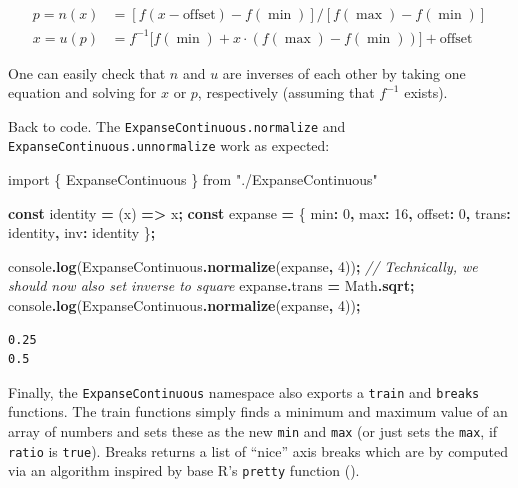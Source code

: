 \documentclass[
  openany]{book}
\newenvironment{Shaded}{\begin{snugshade}}{\end{snugshade}}
\newcommand{\AttributeTok}[1]{\textcolor[rgb]{0.13,0.29,0.53}{#1}}
\newcommand{\BuiltInTok}[1]{#1}
\newcommand{\CommentTok}[1]{\textcolor[rgb]{0.56,0.35,0.01}{\textit{#1}}}
\newcommand{\DecValTok}[1]{\textcolor[rgb]{0.00,0.00,0.81}{#1}}
\newcommand{\FunctionTok}[1]{\textcolor[rgb]{0.13,0.29,0.53}{\textbf{#1}}}
\newcommand{\ImportTok}[1]{#1}
\newcommand{\KeywordTok}[1]{\textcolor[rgb]{0.13,0.29,0.53}{\textbf{#1}}}
\newcommand{\NormalTok}[1]{#1}
\newcommand{\OperatorTok}[1]{\textcolor[rgb]{0.81,0.36,0.00}{\textbf{#1}}}
\newcommand{\StringTok}[1]{\textcolor[rgb]{0.31,0.60,0.02}{#1}}
\theoremstyle{definition}
\theoremstyle{definition}
\theoremstyle{definition}
\theoremstyle{definition}
\theoremstyle{remark}
\begin{document}
\begin{align}
p = n(x) &= [f(x - \text{offset}) - f(\min)] / [f(\max) - f(\min)] \\
x = u(p) &= f^{-1} \big[ f(\min) + x \cdot (f(\max) - f(\min)) \big] + \text{offset}
\end{align}

One can easily check that \(n\) and \(u\) are inverses of each other by taking one equation and solving for \(x\) or \(p\), respectively (assuming that \(f^{-1}\) exists).

Back to code. The \texttt{ExpanseContinuous.normalize} and \texttt{ExpanseContinuous.unnormalize} work as expected:

\begin{Shaded}
\begin{Highlighting}[]
\ImportTok{import}\NormalTok{ \{ ExpanseContinuous \} }\ImportTok{from} \StringTok{"./ExpanseContinuous"}

\KeywordTok{const}\NormalTok{ identity }\OperatorTok{=}\NormalTok{ (x) }\KeywordTok{=\textgreater{}}\NormalTok{ x}\OperatorTok{;}
\KeywordTok{const}\NormalTok{ expanse }\OperatorTok{=}\NormalTok{ \{ }
\NormalTok{  min}\OperatorTok{:} \DecValTok{0}\OperatorTok{,}\NormalTok{ max}\OperatorTok{:} \DecValTok{16}\OperatorTok{,}\NormalTok{ offset}\OperatorTok{:} \DecValTok{0}\OperatorTok{,} 
\NormalTok{  trans}\OperatorTok{:}\NormalTok{ identity}\OperatorTok{,}\NormalTok{ inv}\OperatorTok{:}\NormalTok{ identity }
\NormalTok{\}}\OperatorTok{;}

\BuiltInTok{console}\OperatorTok{.}\FunctionTok{log}\NormalTok{(ExpanseContinuous}\OperatorTok{.}\FunctionTok{normalize}\NormalTok{(expanse}\OperatorTok{,} \DecValTok{4}\NormalTok{))}\OperatorTok{;}
\CommentTok{// Technically, we should now also set inverse to square}
\NormalTok{expanse}\OperatorTok{.}\AttributeTok{trans} \OperatorTok{=} \BuiltInTok{Math}\OperatorTok{.}\FunctionTok{sqrt}\OperatorTok{;} 
\BuiltInTok{console}\OperatorTok{.}\FunctionTok{log}\NormalTok{(ExpanseContinuous}\OperatorTok{.}\FunctionTok{normalize}\NormalTok{(expanse}\OperatorTok{,} \DecValTok{4}\NormalTok{))}\OperatorTok{;}
\end{Highlighting}
\end{Shaded}

\begin{verbatim}
0.25
0.5
\end{verbatim}

Finally, the \texttt{ExpanseContinuous} namespace also exports a \texttt{train} and \texttt{breaks} functions. The train functions simply finds a minimum and maximum value of an array of numbers and sets these as the new \texttt{min} and \texttt{max} (or just sets the \texttt{max}, if \texttt{ratio} is \texttt{true}). Breaks returns a list of ``nice'' axis breaks which are by computed via an algorithm inspired by base R's \texttt{pretty} function ().
\end{document}
